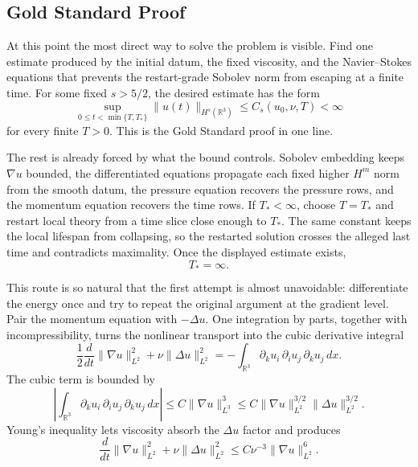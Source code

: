 \subsection{Gold Standard Proof}\label{sub:GoldStandardProof}

At this point the most direct way to solve the problem is visible.
Find one estimate produced by the initial datum, the fixed viscosity, and the Navier--Stokes equations that prevents the restart-grade Sobolev norm from escaping at a finite time.
For some fixed \(s>5/2\), the desired estimate has the form
\[
  \sup_{0\leq t<\min\{T,T_*\}}
  \lVert u(t)\rVert_{H^s(\mathbb R^3)}
  \leq
  C_s(u_0,\nu,T)
  <\infty
\]
for every finite \(T>0\).
This is the Gold Standard proof in one line.

The rest is already forced by what the bound controls.
Sobolev embedding keeps \(\nabla u\) bounded, the differentiated equations propagate each fixed higher \(H^m\) norm from the smooth datum, the pressure equation recovers the pressure rows, and the momentum equation recovers the time rows.
If \(T_*<\infty\), choose \(T=T_*\) and restart local theory from a time slice close enough to \(T_*\).
The same constant keeps the local lifespan from collapsing, so the restarted solution crosses the alleged last time and contradicts maximality.
Once the displayed estimate exists,
\[
  T_*=\infty.
\]

This route is so natural that the first attempt is almost unavoidable: differentiate the energy once and try to repeat the original argument at the gradient level.
Pair the momentum equation with \(-\Delta u\).
One integration by parts, together with incompressibility, turns the nonlinear transport into the cubic derivative integral
\[
  \frac12\frac{d}{dt}\lVert\nabla u\rVert_{L^2}^2
  +
  \nu\lVert\Delta u\rVert_{L^2}^2
  =
  -\int_{\mathbb R^3}
  \partial_k u_i\,\partial_i u_j\,\partial_k u_j\,dx.
\]
The cubic term is bounded by
\[
  \left|
  \int_{\mathbb R^3}
  \partial_k u_i\,\partial_i u_j\,\partial_k u_j\,dx
  \right|
  \leq
  C\lVert\nabla u\rVert_{L^3}^3
  \leq
  C\lVert\nabla u\rVert_{L^2}^{3/2}
  \lVert\Delta u\rVert_{L^2}^{3/2}.
\]
Young's inequality lets viscosity absorb the \(\Delta u\) factor and produces
\[
  \frac{d}{dt}\lVert\nabla u\rVert_{L^2}^2
  +
  \nu\lVert\Delta u\rVert_{L^2}^2
  \leq
  C\nu^{-3}\lVert\nabla u\rVert_{L^2}^6.
\]

